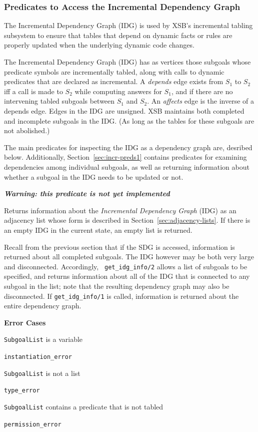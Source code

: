 \subsubsection{Predicates to Access the Incremental Dependency Graph} \label{sec:idg-preds}

The Incremental Dependency Graph (IDG) is used by XSB's incremental
tabling subsystem to ensure that tables that depend on dynamic facts
or rules are properly updated when the underlying dynamic code
changes.

The Incremental Dependency Graph (IDG) has as vertices those subgoals
whose predicate symbols are incrementally tabled, along with calls to
dynamic predicates that are declared as incremental.  A {\em depends}
edge exists from $S_1$ to $S_2$ iff a call is made to $S_2$ while
computing answers for $S_1$, and if there are no intervening tabled
subgoals between $S_1$ and $S_2$.  An {\em affects} edge is the
inverse of a depends edge.  Edges in the IDG are unsigned.  XSB
maintains both completed and incomplete subgoals in the IDG. (As long
as the tables for these subgoals are not abolished.)

The main predicates for inspecting the IDG as a dependency graph are,
desribed below.  Additionally, Section~\ref{sec:incr-preds1} contains
predicates for examining dependencies among individual subgoals, as
well as returning information about whether a subgoal in the IDG needs
to be updated or not.

\begin{description}
%

{\bf {\em Warning: this predicate is not yet implemented}}

Returns information about the {\em Incremental Dependency Graph} (IDG)
as an adjacency list whose form is described in Section~\ref{sec:adjacency-lists}.
%
If there is an empty IDG in the current state, an empty list
is returned.

Recall from the previous section that if the SDG is accessed,
information is returned about all completed subgoals.  The IDG however
may be both very large and disconnected.  Accordingly, {\tt
  get\_idg\_info/2} allows a list of subgoals to be specified, and
returns information about all of the IDG that is connected to any
subgoal in the list; note that the resulting dependency graph may also
be disconnected.  If {\tt get\_idg\_info/1} is called, information is
returned about the entire dependency graph.

{\bf Error Cases}
\bi
\item {\tt SubgoalList} is a variable
\bi
\item 	{\tt instantiation\_error}
\ei
\item {\tt SubgoalList} is not a list
\bi
\item 	{\tt type\_error}
\ei
\item {\tt SubgoalList} contains a predicate that is not tabled
\bi
\item 	{\tt permission\_error}
\ei
\ei
\end{description}

